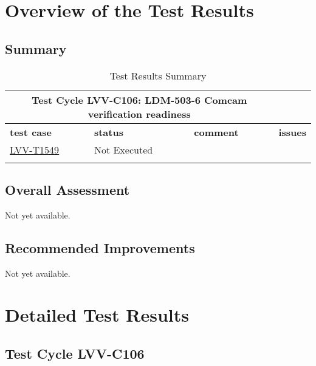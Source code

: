 \documentclass[DM,lsstdraft,STR,toc]{lsstdoc}
\begin{document}
\newpage

\section{Overview of the Test Results}
\label{sect:overview}

\subsection{Summary}
\label{sect:summarytable}

\begin{longtable}{p{}p{}p{}p{}}
\toprule

  \multicolumn{3}{c}{ Test Cycle {\bf LVV-C106: LDM-503-6 Comcam verification readiness
 }} \\\hline

  {\bf \footnotesize test case} & {\bf \footnotesize status} & {\bf \footnotesize comment} & {\bf \footnotesize issues} \\\toprule

    \href{https://jira.lsstcorp.org/secure/Tests.jspa#/testCase/LVV-T1549}{LVV-T1549}
    & Not Executed &  &
    \\\hline

\caption{Test Results Summary}
\label{table:summary}
\end{longtable}

\subsection{Overall Assessment}
\label{sect:overallassessment}

Not yet available.

\subsection{Recommended Improvements}
\label{sect:recommendations}

Not yet available.

\newpage
\section{Detailed Test Results}
\label{sect:detailedtestresults}


  \subsection{Test Cycle LVV-C106 }
\end{document}
